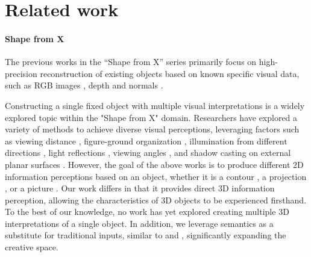 \section{Related work}
\paragraph{Shape from X} The previous works in the ``Shape from X'' series primarily focus on high-precision reconstruction of existing objects based on known specific visual data, such as RGB images \cite{colmap1,colmap2,SFM,MVS,WLL*21}, depth \cite{kfusion,bfusion} and normals \cite{bini2022cao,Kadambi15}. 

Constructing a single fixed object with multiple visual interpretations is a widely explored topic within the "Shape from X" domain. Researchers have explored a variety of methods to achieve diverse visual perceptions, leveraging factors such as viewing distance \cite{Hybridimages}, figure-ground organization \cite{GeneratingAmbiguousFigure-GroundImages}, illumination from different directions \cite{Reliefsasimages,ShadowPix,Attenuators}, light reflections \cite{reflectors,Mirror}, viewing angles \cite{Generationofviewdependentmodels,LenticularObjects,Hsiao:2018:MVWA:,Fabricable3DWireArt,qu2023dreamwire}, and shadow casting on external planar surfaces \cite{MP09,STR22}. 
However, the goal of the above works is to produce different 2D information perceptions based on an object, whether it is a contour \cite{Hsiao:2018:MVWA:,Fabricable3DWireArt,qu2023dreamwire}, a projection \cite{MP09,STR22}, or a picture \cite{Mirror,caustics,softshadow}. Our work differs in that it provides direct 3D information perception, allowing the characteristics of 3D objects to be experienced firsthand. To the best of our knowledge, no work has yet explored creating multiple 3D interpretations of a single object. In addition, we leverage semantics as a substitute for traditional inputs, similar to \cite{Fabricable3DWireArt} and \cite{qu2023dreamwire}, significantly expanding the creative space. 

